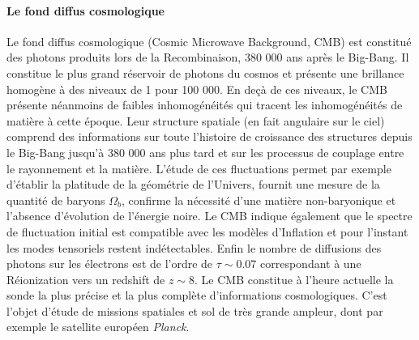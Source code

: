 \paragraph{Le fond diffus cosmologique}
Le fond diffus cosmologique (Cosmic Microwave Background, CMB) est constitué des photons produits lors de la Recombinaison, 380 000 ans après le Big-Bang. Il constitue le plus grand réservoir de photons du cosmos et présente une brillance homogène à des niveaux de 1 pour 100 000. En deçà de ces niveaux, le CMB présente néanmoins de faibles inhomogénéités qui tracent les inhomogénéités de matière à cette époque. Leur structure spatiale (en fait angulaire sur le ciel) comprend des informations sur toute l'histoire de croissance des structures depuis le Big-Bang jusqu'à 380 000 ans plus tard et sur les processus de couplage entre le rayonnement et la matière. L'étude de ces fluctuations permet par exemple d'établir la platitude de la géométrie de l'Univers, fournit une mesure de la quantité de baryons $\Omega_b$, confirme la nécessité d'une matière non-baryonique et l'absence d'évolution de l'énergie noire. Le CMB indique également que le spectre de fluctuation initial est compatible avec les modèles d'Inflation  et pour l'instant les modes tensoriels restent indétectables. Enfin le nombre de diffusions  des photons sur les électrons est de l'ordre de $\tau\sim 0.07$ correspondant à une Réionization vers un redshift de $z\sim8$. Le CMB constitue à l'heure actuelle la sonde la plus précise et la plus complète d'informations cosmologiques. C'est l'objet d'étude de missions spatiales et sol de très grande ampleur, dont par exemple le satellite européen \textit{Planck}.

